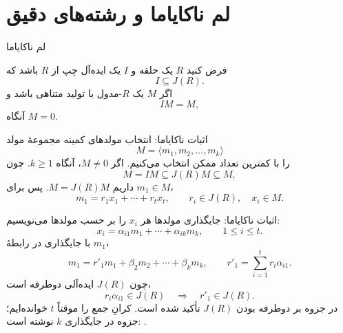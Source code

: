 \section{لم ناکایاما و رشته‌های دقیق}

\begin{frame}[t]{لم ناکایاما}
    \label{lec16:nakayama}
    \begin{theorem}[لم ناکایاما]
        فرض کنید \(R\) یک حلقه و \(I\) یک ایده‌آل چپ از \(R\) باشد که
        \[
            I\subseteq J(R).
        \]
        اگر \(M\) یک \(R\)-مدول با تولید متناهی باشد و
        \[
            IM=M,
        \]
        آنگاه \(M=0\).
    \end{theorem}
\end{frame}

\begin{frame}[t]{اثبات ناکایاما: انتخاب مولدهای کمینه}
    \label{lec16:nakayama-minimal}
    مجموعهٔ مولد
    \[
        M=\langle m_1,m_2,\ldots,m_k\rangle
    \]
    را با کمترین تعداد ممکن انتخاب می‌کنیم. اگر \(M\ne0\)، آنگاه \(k\ge1\).
    چون
    \[
        M=IM\subseteq J(R)M\subseteq M,
    \]
    داریم \(M=J(R)M\). پس برای \(m_1\in M\)،
    \[
        m_1=r_1x_1+\cdots+r_tx_t,
        \qquad r_i\in J(R),\quad x_i\in M.
    \]
\end{frame}

\begin{frame}[t]{اثبات ناکایاما: جایگذاری مولدها}
    \label{lec16:nakayama-coefficients}
    هر \(x_i\) را بر حسب مولدها می‌نویسیم:
    \[
        x_i=\alpha_{i1}m_1+\cdots+\alpha_{ik}m_k,
        \qquad 1\le i\le t.
    \]
    با جایگذاری در رابطهٔ \(m_1\)،
    \[
        m_1=r'_1m_1+\beta_2m_2+\cdots+\beta_km_k,
        \qquad r'_1=\sum_{i=1}^{t}r_i\alpha_{i1}.
    \]
    چون \(J(R)\) ایده‌آلی دوطرفه است،
    \[
        r_i\alpha_{i1}\in J(R)\quad\Longrightarrow\quad r'_1\in J(R).
    \]
    {\footnotesize در جزوه بر دوطرفه بودن \(J(R)\) تأکید شده است.
    کرانِ جمع را موقتاً \(t\) خوانده‌ایم؛ جزوه در جایگذاری \(k\) نوشته است: .}
\end{frame}

